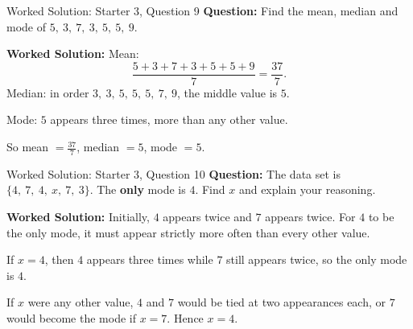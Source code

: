 \documentclass{beamer}
\begin{document}
\begin{frame}{Worked Solution: Starter 3, Question 9}
\small
\textbf{Question:} Find the mean, median and mode of \(5,\ 3,\ 7,\ 3,\ 5,\ 5,\ 9\).

\smallskip
\textbf{Worked Solution:} Mean:
\[
\frac{5+3+7+3+5+5+9}{7}=\frac{37}{7}.
\]
Median: in order \(3,\ 3,\ 5,\ 5,\ 5,\ 7,\ 9\), the middle value is \(5\).

Mode: \(5\) appears three times, more than any other value.

So mean \(=\frac{37}{7}\), median \(=5\), mode \(=5\).
\end{frame}

\begin{frame}{Worked Solution: Starter 3, Question 10}
\small
\textbf{Question:} The data set is \(\{4,\ 7,\ 4,\ x,\ 7,\ 3\}\). The \textbf{only} mode is \(4\). Find \(x\) and explain your reasoning.

\smallskip
\textbf{Worked Solution:} Initially, \(4\) appears twice and \(7\) appears twice. For \(4\) to be the only mode, it must appear strictly more often than every other value.

If \(x=4\), then \(4\) appears three times while \(7\) still appears twice, so the only mode is \(4\).

If \(x\) were any other value, \(4\) and \(7\) would be tied at two appearances each, or \(7\) would become the mode if \(x=7\). Hence \(x=4\).
\end{frame}
\end{document}
